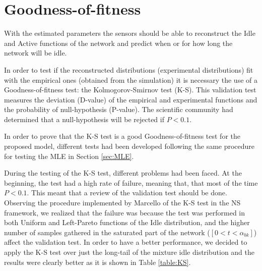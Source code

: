 \section{Goodness-of-fitness} \label{sec:KS}
With the estimated parameters the sensors should be able to reconstruct the Idle and Active functions of the network and predict when or for how long the network will be idle. 

In order to test if the reconstructed distributions (experimental distributions) fit with the empirical ones (obtained from the simulation) it is necessary the use of a Goodness-of-fitness test: the Kolmogorov-Smirnov test (\acs{K-S}). This validation test measures the deviation (D-value) of the empirical and experimental functions and the probability of null-hypothesis (P-value). The scientific community had determined that a null-hypothesis will be rejected if ${P<0.1}$.

In order to prove that the \acs{K-S} test is a good Goodness-of-fitness test for the proposed model, different tests had been developed following the same procedure for testing the \acs{MLE} in Section \ref{sec:MLE}.

During the testing of the \acs{K-S} test, different problems had been faced. At the beginning, the test had a high rate of failure, meaning that, that most of the time ${P<0.1}$. This meant that a review of the validation test should be done. Observing the procedure implemented by Marcello of the \acs{K-S} test in the NS framework, we realized that the failure was because the test was performed in both Uniform and Left-Pareto functions of the Idle distribution, and the higher number of samples gathered in the saturated part of the network ($[0 < t < \alpha_{bk}]$) affect the validation test. In order to have a better performance, we decided to apply the K-S test over just the long-tail of the mixture idle distribution and the results were clearly better as it is shown in Table \ref{table:KS}.



